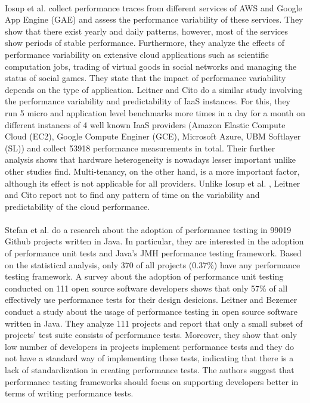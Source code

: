 \documentclass{seal_thesis}
\begin{document}
\\
Iosup et al. \cite{Iosup} collect performance traces from different services of AWS and Google App Engine (GAE) and assess the performance variability of these services. They show that there exist yearly and daily patterns, however, most of the services show periods of stable performance. Furthermore, they analyze the effects of performance variability on extensive cloud applications such as scientific computation jobs, trading of virtual goods in social networks and managing the status of social games. They state that the impact of performance variability depends on the type of application. Leitner and Cito \cite{Leitner:2016:PCS:2926746.2885497} do a similar study involving the performance variability and predictability of IaaS instances. For this, they run 5 micro and application level benchmarks more times in a day for a month on different instances of 4 well known IaaS providers (Amazon Elastic Compute Cloud (EC2), Google Compute Enginer (GCE), Microsoft Azure, UBM Softlayer (SL)) and collect 53918 performance measurements in total. Their further analysis shows that hardware heterogeneity is nowadays lesser important unlike other studies find. Multi-tenancy, on the other hand, is a more important factor, although its effect is not applicable for all providers. Unlike Iosup et al. \cite{Iosup}, Leitner and Cito \cite{Leitner:2016:PCS:2926746.2885497} report not to find any pattern of time on the variability and predictability of the cloud performance.\\
\\
Stefan et al. \cite{Stefan:2017:UTP:3030207.3030226} do a research about the adoption of performance testing in 99019 Github projects written in Java. In particular, they are interested in the adoption of performance unit tests and Java's JMH performance testing framework. Based on the statistical analysis, only 370 of all projects (0.37\%) have any performance testing framework. A survey about the adoption of performance unit testing conducted on 111 open source software developers shows that only 57\% of all effectively use performance tests for their design desicions. Leitner and Bezemer \cite{Leitner:2017:ESS:3030207.3030213} conduct a study about the usage of performance testing in open source software written in Java. They analyze 111 projects and report that only a small subset of projects' test suite consists of performance tests. Moreover, they show that only low number of developers in projects implement performance tests and they do not have a standard way of implementing these tests, indicating that there is a lack of standardization in creating performance tests. The authors suggest that performance testing frameworks should focus on supporting developers better in terms of writing performance tests.\\
\end{document}
